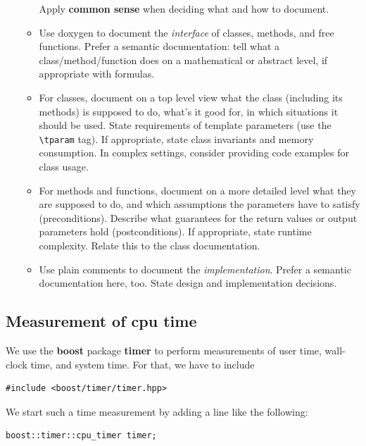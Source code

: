 \documentclass[11pt]{article}
\begin{document}
\begin{itemize}
\begin{itemize}
           Apply \textbf{common sense} when deciding what and how to document.
   \item Use doxygen to document the \emph{interface} of classes, methods, and free functions. Prefer a semantic documentation: tell what
           a class/method/function does on a mathematical or abstract level, if appropriate with formulas. 
   \item For classes, document on a top level view what the class (including its methods) is supposed to do, what's it good for,
           in which situations it should be used. State requirements of template parameters (use the \verb?\tparam? tag). If appropriate,
           state class invariants and memory consumption. In complex settings, consider providing code examples for class usage.
   \item For methods and functions, document on a more detailed level what they are supposed to do, and which assumptions
           the parameters have to satisfy (preconditions). Describe what guarantees for the return values or output parameters hold 
           (postconditions). If appropriate, state runtime complexity. Relate this to the class documentation.
   \item Use plain comments to document the \emph{implementation}. Prefer a semantic documentation here, too. State design
           and implementation decisions.
  \end{itemize}
\end{itemize}

\subsection{Measurement of cpu time}\label{cpu}

We use the {\bf boost} package {\bf timer} to perform  measurements of user time, wall-clock time, and system time. For that, we have to include
\begin{lstlisting}
#include <boost/timer/timer.hpp>
\end{lstlisting}

\noindent 
We start such a time measurement by adding a line like the following:
\begin{lstlisting}
boost::timer::cpu_timer timer;
\end{lstlisting}
\end{document}
